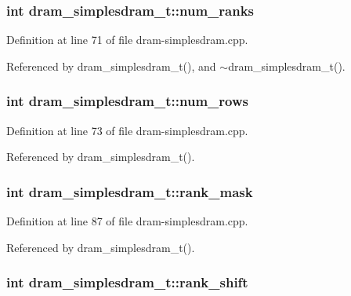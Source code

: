 \subsubsection[{num\_\-ranks}]{\setlength{\rightskip}{0pt plus 5cm}int {\bf dram\_\-simplesdram\_\-t::num\_\-ranks}\hspace{0.3cm}{\tt  [protected]}}\label{classdram__simplesdram__t_f5ba9d77748fdfd788480a9fb2dcb8dd}




Definition at line 71 of file dram-simplesdram.cpp.

Referenced by dram\_\-simplesdram\_\-t(), and $\sim$dram\_\-simplesdram\_\-t().
\subsubsection[{num\_\-rows}]{\setlength{\rightskip}{0pt plus 5cm}int {\bf dram\_\-simplesdram\_\-t::num\_\-rows}\hspace{0.3cm}{\tt  [protected]}}\label{classdram__simplesdram__t_27363871f4e5abc4d467d566caf36225}




Definition at line 73 of file dram-simplesdram.cpp.

Referenced by dram\_\-simplesdram\_\-t().
\subsubsection[{rank\_\-mask}]{\setlength{\rightskip}{0pt plus 5cm}int {\bf dram\_\-simplesdram\_\-t::rank\_\-mask}\hspace{0.3cm}{\tt  [protected]}}\label{classdram__simplesdram__t_ef2e277e2eb76c50d80c614be19d30ea}




Definition at line 87 of file dram-simplesdram.cpp.

Referenced by dram\_\-simplesdram\_\-t().
\subsubsection[{rank\_\-shift}]{\setlength{\rightskip}{0pt plus 5cm}int {\bf dram\_\-simplesdram\_\-t::rank\_\-shift}\hspace{0.3cm}{\tt  [protected]}}\label{classdram__simplesdram__t_c439e85e8b07951b556062e268745d39}




